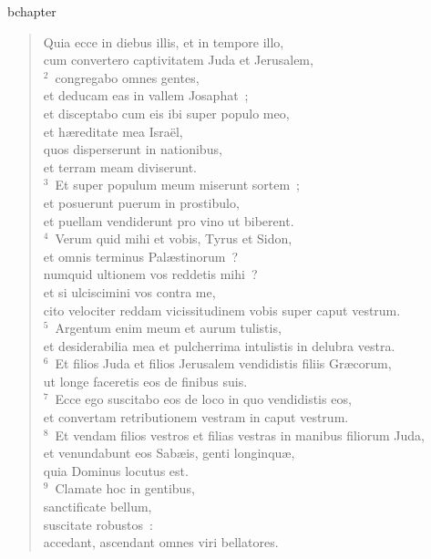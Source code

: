 bchapter\begin{flushleft}\begin{verse}\vspace{-19pt}Quia ecce in diebus illis, et in tempore illo,\\ cum convertero captivitatem Juda et Jerusalem,\\
${}^{2}$~congregabo omnes gentes,\\ et deducam eas in vallem Josaphat~;\\ et disceptabo cum eis ibi super populo meo,\\ et h\ae reditate mea Isra\"el,\\ quos disperserunt in nationibus,\\ et terram meam diviserunt.\\
${}^{3}$~Et super populum meum miserunt sortem~;\\ et posuerunt puerum in prostibulo,\\ et puellam vendiderunt pro vino ut biberent.\\
${}^{4}$~Verum quid mihi et vobis, Tyrus et Sidon,\\ et omnis terminus Pal\ae stinorum~?\\ numquid ultionem vos reddetis mihi~?\\ et si ulciscimini vos contra me,\\ cito velociter reddam vicissitudinem vobis super caput vestrum.\\
${}^{5}$~Argentum enim meum et aurum tulistis,\\ et desiderabilia mea et pulcherrima intulistis in delubra vestra.\\
${}^{6}$~Et filios Juda et filios Jerusalem vendidistis filiis Gr\ae corum,\\ ut longe faceretis eos de finibus suis.\\
${}^{7}$~Ecce ego suscitabo eos de loco in quo vendidistis eos,\\ et convertam retributionem vestram in caput vestrum.\\
${}^{8}$~Et vendam filios vestros et filias vestras in manibus filiorum Juda,\\ et venundabunt eos Sab\ae is, genti longinqu\ae ,\\ quia Dominus locutus est.\\
${}^{9}$~Clamate hoc in gentibus,\\ sanctificate bellum,\\ suscitate robustos~:\\ accedant, ascendant omnes viri bellatores.\\

\end{verse}
\end{flushleft}

